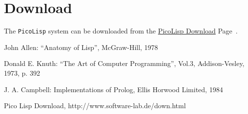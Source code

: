  
\section{Download}
\label{sec:ul-download}

The \texttt{PicoLisp} system can be downloaded from the
\href{http://www.software-lab.de/down.html}{PicoLisp Download}
Page~\cite{down2}.

\begin{thebibliography}{[9]}

 John Allen: ``Anatomy of Lisp'', McGraw-Hill, 1978

 Donald E. Knuth: ``The Art of Computer Programming'',
  Vol.3, Addison-Vesley, 1973, p. 392

J. A. Campbell: Implementations of Prolog, Ellis Horwood Limited, 1984

 Pico Lisp Download, http://www.software-lab.de/down.html

\end{thebibliography}


